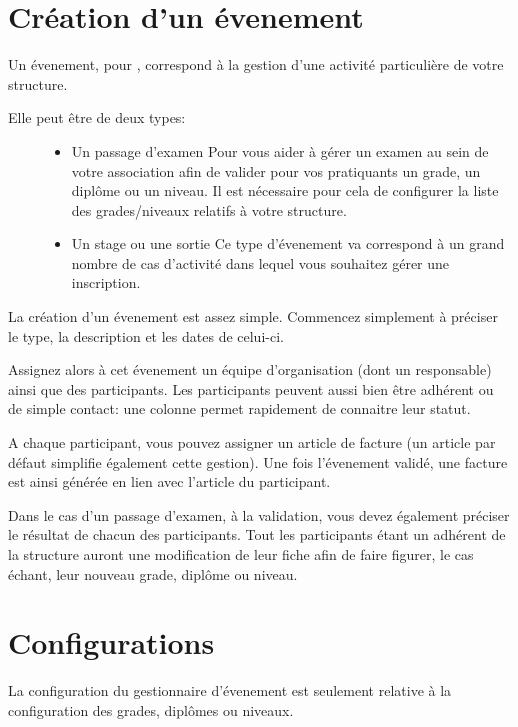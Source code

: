\documentclass[a4paper,10pt,oneside,french]{sphinxmanual}
\begin{document}
\section{Création d’un évenement}
\label{\detokenize{event/newevent::doc}}\label{\detokenize{event/newevent:creation-d-un-evenement}}
Un évenement, pour , correspond à la gestion d’une activité particulière de votre structure.
\begin{description}
\item[{Elle peut être de deux types:}] \leavevmode\begin{itemize}
\item {} 
Un passage d’examen
Pour vous aider à gérer un examen au sein de votre association afin de valider pour vos pratiquants un grade, un diplôme ou un niveau.
Il est nécessaire pour cela de configurer la liste des grades/niveaux relatifs à votre structure.

\item {} 
Un stage ou une sortie
Ce type d’évenement va correspond à un grand nombre de cas d’activité dans lequel vous souhaitez gérer une inscription.

\end{itemize}

\end{description}

La création d’un évenement est assez simple.
Commencez simplement à préciser le type, la description et les dates de celui-ci.

Assignez alors à cet évenement un équipe d’organisation (dont un responsable) ainsi que des participants.
Les participants peuvent aussi bien être adhérent ou de simple contact: une colonne permet rapidement de connaitre leur statut.

A chaque participant, vous pouvez assigner un article de facture (un article par défaut simplifie également cette gestion).
Une fois l’évenement validé, une facture est ainsi générée en lien avec l’article du participant.

Dans le cas d’un passage d’examen, à la validation, vous devez également préciser le résultat de chacun des participants.
Tout les participants étant un adhérent de la structure auront une modification de leur fiche afin de faire figurer, le cas échant, leur nouveau grade, diplôme ou niveau.


\section{Configurations}
\label{\detokenize{event/config::doc}}\label{\detokenize{event/config:configurations}}
La configuration du gestionnaire d’évenement est seulement relative à la configuration des grades, diplômes ou niveaux.
\end{document}
